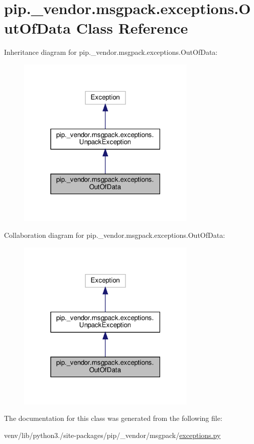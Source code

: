 \hypertarget{classpip_1_1__vendor_1_1msgpack_1_1exceptions_1_1OutOfData}{}\section{pip.\+\_\+vendor.\+msgpack.\+exceptions.\+Out\+Of\+Data Class Reference}
\label{classpip_1_1__vendor_1_1msgpack_1_1exceptions_1_1OutOfData}


Inheritance diagram for pip.\+\_\+vendor.\+msgpack.\+exceptions.\+Out\+Of\+Data\+:
\nopagebreak
\begin{figure}[H]
\begin{center}
\leavevmode
\includegraphics[width=243pt]{classpip_1_1__vendor_1_1msgpack_1_1exceptions_1_1OutOfData__inherit__graph}
\end{center}
\end{figure}


Collaboration diagram for pip.\+\_\+vendor.\+msgpack.\+exceptions.\+Out\+Of\+Data\+:
\nopagebreak
\begin{figure}[H]
\begin{center}
\leavevmode
\includegraphics[width=243pt]{classpip_1_1__vendor_1_1msgpack_1_1exceptions_1_1OutOfData__coll__graph}
\end{center}
\end{figure}


The documentation for this class was generated from the following file\+:\begin{DoxyCompactItemize}
\item 
venv/lib/python3./site-\/packages/pip/\+\_\+vendor/msgpack/\hyperlink{pip_2__vendor_2msgpack_2exceptions_8py}{exceptions.\+py}\end{DoxyCompactItemize}
